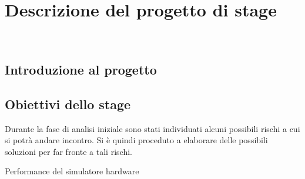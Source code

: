 \chapter{Descrizione del progetto di stage}
\label{cap:descrizione-stage}

\\

\section{Introduzione al progetto}

\section{Obiettivi dello stage}

Durante la fase di analisi iniziale sono stati individuati alcuni possibili rischi a cui si potrà andare incontro.
Si è quindi proceduto a elaborare delle possibili soluzioni per far fronte a tali rischi.\\

\begin{risk}{Performance del simulatore hardware}
    \label{risk:hardware-simulator} 
\end{risk}



